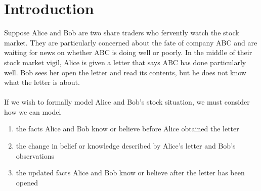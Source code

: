 \chapter{Introduction} \label{chapter:intro}

Suppose Alice and Bob are two share traders who fervently watch the stock market. They
are particularly concerned about the fate of company ABC and are waiting for news on whether ABC is
doing well or poorly. In the middle of their stock market vigil, Alice is given a letter that says
ABC has done particularly well. Bob sees her open the letter and read its contents, but he does not
know what the letter is about.\\
\\
If we wish to formally model Alice and Bob's stock situation, we must consider how we can model
\begin{enumerate}
	\item the facts Alice and Bob know or believe before Alice obtained the letter
	\item the change in belief or knowledge described by Alice's letter and Bob's observations
	\item the updated facts Alice and Bob know or believe after the letter has been opened
\end{enumerate}

